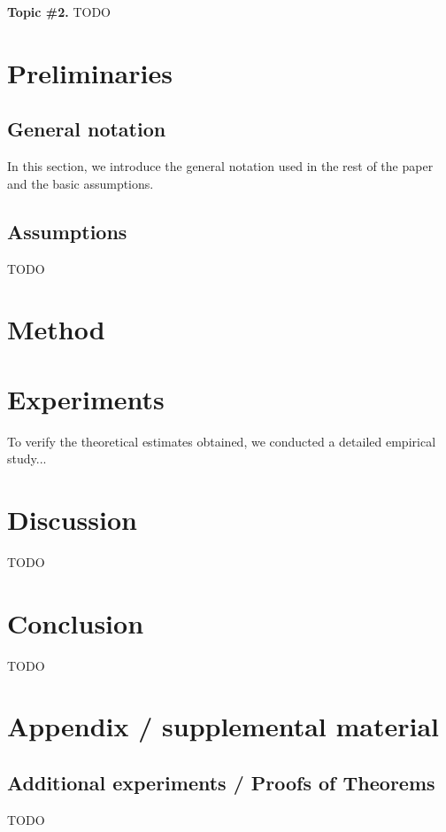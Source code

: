 \documentclass{article}
\begin{document}
\textbf{Topic \#2.}
TODO

\section{Preliminaries}\label{sec:prelim}

\subsection{General notation}

In this section, we introduce the general notation used in the rest of the paper and the basic assumptions. 

\subsection{Assumptions} 

TODO

\section{Method}\label{sec:method}

\section{Experiments}\label{sec:exp}

To verify the theoretical estimates obtained, we conducted a detailed empirical study...

\section{Discussion}\label{sec:disc}

TODO

\section{Conclusion}\label{sec:concl}

TODO







\newpage
\appendix
\section{Appendix / supplemental material}\label{app}

\subsection{Additional experiments / Proofs of Theorems}\label{app:exp}

TODO
\end{document}
